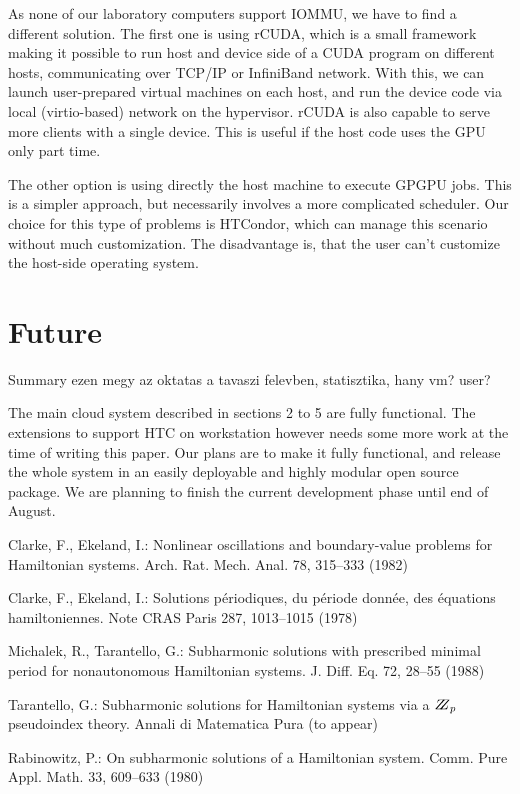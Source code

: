 \documentclass{llncs}
\begin{document}
As none of our laboratory computers support IOMMU, we have to find a different solution. The first one is using rCUDA, which is a small framework making it possible to run host and device side of a CUDA program on different hosts, communicating over TCP/IP or InfiniBand network. With this, we can launch user-prepared virtual machines on each host, and run the device code via local (virtio-based) network on the hypervisor. rCUDA is also capable to serve more clients with a single device. This is useful if the host code uses the GPU only part time.

The other option is using directly the host machine to execute GPGPU jobs. This is a simpler approach, but necessarily involves a more complicated scheduler. Our choice for this type of problems is HTCondor, which can manage this scenario without much customization. The disadvantage is, that the user can't customize the host-side operating system.


\section*{Future}
Summary
ezen megy az oktatas a tavaszi felevben, statisztika, hany vm? user? 

The main cloud system described in sections 2 to 5 are fully functional. The extensions to support HTC on workstation however needs some more work at the time of writing this paper. Our plans are to make it fully functional, and release the whole system in an easily deployable and highly modular open source package. We are planning to finish the current development phase until end of August. 




%
%
\begin{thebibliography}{5}
%
Clarke, F., Ekeland, I.:
Nonlinear oscillations and
boundary-value problems for Hamiltonian systems.
Arch. Rat. Mech. Anal. 78, 315--333 (1982)

Clarke, F., Ekeland, I.:
Solutions p\'{e}riodiques, du
p\'{e}riode donn\'{e}e, des \'{e}quations hamiltoniennes.
Note CRAS Paris 287, 1013--1015 (1978)

Michalek, R., Tarantello, G.:
Subharmonic solutions with prescribed minimal
period for nonautonomous Hamiltonian systems.
J. Diff. Eq. 72, 28--55 (1988)

Tarantello, G.:
Subharmonic solutions for Hamiltonian
systems via a $\bbbz_{p}$ pseudoindex theory.
Annali di Matematica Pura (to appear)

Rabinowitz, P.:
On subharmonic solutions of a Hamiltonian system.
Comm. Pure Appl. Math. 33, 609--633 (1980)

\end{thebibliography}
\end{document}
